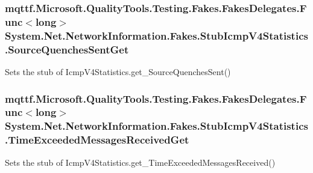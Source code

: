 \hypertarget{class_system_1_1_net_1_1_network_information_1_1_fakes_1_1_stub_icmp_v4_statistics_a951c6558f05cad731f16bf5baeae8d0f}{
\subsubsection[{Source\-Quenches\-Sent\-Get}]{\setlength{\rightskip}{0pt plus 5cm}mqttf.\-Microsoft.\-Quality\-Tools.\-Testing.\-Fakes.\-Fakes\-Delegates.\-Func$<$long$>$ System.\-Net.\-Network\-Information.\-Fakes.\-Stub\-Icmp\-V4\-Statistics.\-Source\-Quenches\-Sent\-Get}}\label{class_system_1_1_net_1_1_network_information_1_1_fakes_1_1_stub_icmp_v4_statistics_a951c6558f05cad731f16bf5baeae8d0f}


Sets the stub of Icmp\-V4\-Statistics.\-get\-\_\-\-Source\-Quenches\-Sent()

\hypertarget{class_system_1_1_net_1_1_network_information_1_1_fakes_1_1_stub_icmp_v4_statistics_a0732d7e123ec2e478f23dbc8c4dd65a2}{
\subsubsection[{Time\-Exceeded\-Messages\-Received\-Get}]{\setlength{\rightskip}{0pt plus 5cm}mqttf.\-Microsoft.\-Quality\-Tools.\-Testing.\-Fakes.\-Fakes\-Delegates.\-Func$<$long$>$ System.\-Net.\-Network\-Information.\-Fakes.\-Stub\-Icmp\-V4\-Statistics.\-Time\-Exceeded\-Messages\-Received\-Get}}\label{class_system_1_1_net_1_1_network_information_1_1_fakes_1_1_stub_icmp_v4_statistics_a0732d7e123ec2e478f23dbc8c4dd65a2}


Sets the stub of Icmp\-V4\-Statistics.\-get\-\_\-\-Time\-Exceeded\-Messages\-Received()

